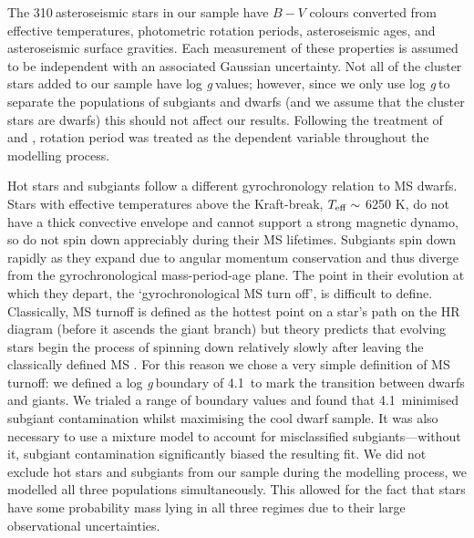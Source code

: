 \documentclass[useAMS, usenatbib]{mn2e}
\newcommand{\logg}{log \emph{g}}
\newcommand{\nastero}{310}
\newcommand{\subcut}{4.1~}
\begin{document}
The \nastero$~$asteroseismic stars in our sample have $B-V$ colours converted
from effective temperatures, photometric rotation periods,
asteroseismic ages, and asteroseismic surface gravities.
Each measurement of these properties is assumed to be independent with an
associated Gaussian uncertainty.
Not all of the cluster stars added to our sample have \logg$~$values; however,
since we only use \logg$~$to separate the populations of subgiants and dwarfs
(and we assume that the cluster stars are dwarfs) this should not affect our
results.
Following the treatment of \citet{Barnes2007} and \citet{Mamajek2008},
rotation period was treated as the dependent variable throughout the modelling
process.

Hot stars and subgiants follow a different gyrochronology relation to MS
dwarfs.
Stars with effective temperatures above the Kraft-break, $T_{\rm{eff}}
\sim$ 6250 K, \citep{Kraft1967} do not have a thick convective envelope and
cannot support a strong magnetic dynamo, so do not spin down appreciably
during their MS lifetimes.
Subgiants spin down rapidly as they expand due to angular momentum
conservation and thus diverge from the gyrochronological mass-period-age
plane.
The point in their evolution at which they depart, the `gyrochronological MS
turn off', is difficult to define.
Classically, MS turnoff is defined as the hottest point on a star's path on
the HR diagram (before it ascends the giant branch) but theory predicts that
evolving stars begin the process of spinning down relatively slowly after
leaving the classically defined MS \citep{vanSaders2013}.
For this reason we chose a very simple definition of MS turnoff: we defined
a \logg$~$boundary of \subcut to mark the transition between dwarfs and
giants.
We trialed a range of boundary values and found that \subcut minimised subgiant
contamination whilst maximising the cool dwarf sample.
It was also necessary to use a mixture model to account for misclassified
subgiants---without it, subgiant contamination significantly biased the
resulting fit.
We did not exclude hot stars and subgiants from our sample during the
modelling process, we modelled all three populations simultaneously.
This allowed for the fact that stars have some probability mass lying in all
three regimes due to their large observational uncertainties.
\end{document}
